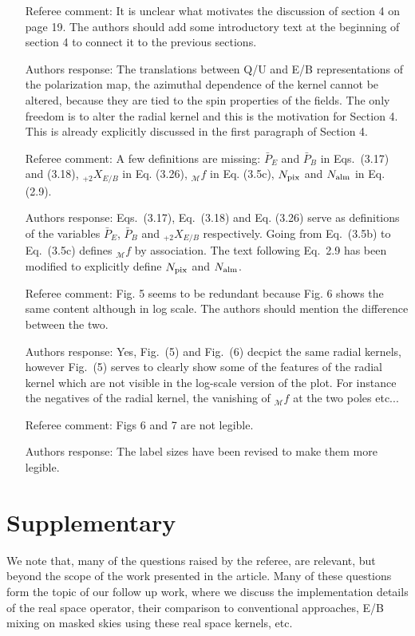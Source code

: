 \documentclass[12pt]{article}
\begin{document}
\begin{itemize}
\item[{Referee comment: }] It is unclear what motivates the discussion of section 4 on page 19. The authors should add some introductory text at the beginning of section 4 to connect it to the previous sections.
\item[{Authors response: }] The translations between Q/U and E/B representations of the polarization map, the azimuthal dependence of the kernel cannot be altered, because they are tied to the spin properties of the fields. The only freedom is to alter the radial kernel and this is the motivation for Section 4. This is already explicitly discussed in the first paragraph of Section 4.

\item[{Referee comment: }] A few definitions are missing: $\bar P_E$ and $\bar P_B$ in Eqs.~(3.17) and (3.18), ${}_{+2} X_{E/B}$ in Eq. (3.26), ${}_\mathcal{M} f$ in Eq. (3.5c), $N_{\rm pix}$ and $N_{\rm alm}$ in Eq. (2.9).
\item[{Authors response: }] Eqs.~(3.17),  Eq.~(3.18) and Eq. (3.26) serve as definitions of the variables $\bar P_E$, $\bar P_B$ and ${}_{+2} X_{E/B}$ respectively. Going from Eq.~(3.5b) to Eq.~(3.5c) defines ${}_\mathcal{M} f$ by association. The text following Eq.~2.9 has been modified to explicitly define $N_{\rm pix}$ and $N_{\rm alm}$.

\item[{Referee comment: }] Fig. 5 seems to be redundant because Fig. 6 shows the same content although in log scale. The authors should mention the difference between the two.
\item[{Authors response: }] Yes, Fig.~(5) and Fig.~(6) decpict the same radial kernels, however Fig.~(5) serves to clearly show some of the features of the radial kernel which are not visible in the log-scale version of the plot. For instance the negatives of the radial kernel, the vanishing of ${}_\mathcal{M}f$ at the two poles etc...

\item[{Referee comment: }] Figs 6 and 7 are not legible.
\item[{Authors response: }] The label sizes have been revised to make them more legible.


\end{itemize}

\newpage
\section*{Supplementary}
We note that, many of the questions raised by the referee, are relevant, but beyond the scope of the work presented in the article. Many of these questions form the topic of our follow up work, where we discuss the implementation details of the real space operator, their comparison to conventional approaches, E/B mixing on masked skies using these real space kernels, etc. 
\end{document}
